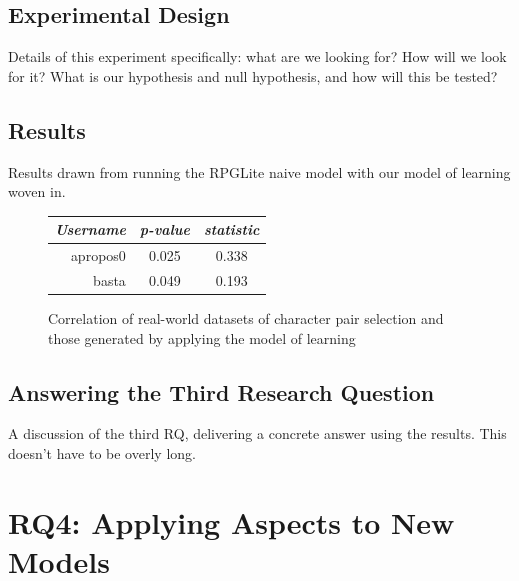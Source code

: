 \subsection{Experimental Design}

Details of this experiment specifically: what are we looking for? How will we
look for it? What is our hypothesis and null hypothesis, and how will this be
tested?

\subsection{Results}

Results drawn from running the RPGLite naive model with our model of learning
woven in.


\begin{figure}[h]
  \centering
  
  \begin{minipage}{.7\textwidth}
    \centering
    \begin{tabular}{r|c|c}
      \emph{Username} & \emph{p-value} & \emph{\tau{} statistic} \\\hline\hline
      apropos0 & 0.025 & 0.338 \\
      basta & 0.049 & 0.193 \\
    \end{tabular}
    \caption{Correlation of real-world datasets of character pair selection and those generated by applying the \aspectoriented model of learning}
    \label{learning_model_results_table_comparison_to_real_world_datasets}
  \end{minipage}
  
\end{figure}




\subsection{Answering the Third Research Question}

A discussion of the third RQ, delivering a concrete answer using the results.
This doesn't have to be overly long.





\section{RQ4: Applying Aspects to New Models}
\label{rq4_results}

